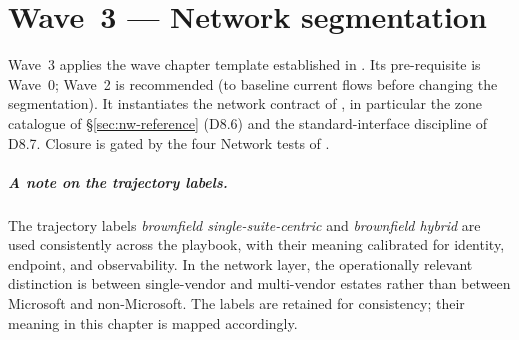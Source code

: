 
\chapter{Wave~3 --- Network segmentation}
\label{ch:wave3-network}

\begin{caveatbox}[Dependencies]
\noindent Wave~3 applies the wave chapter template established in
. Its pre-requisite is Wave~0;
Wave~2 is recommended (to baseline current flows before changing
the segmentation). It instantiates the network contract of
, in particular the zone catalogue of
\S\ref{sec:nw-reference} (D8.6) and the standard-interface
discipline of D8.7. Closure is gated by the four Network tests of
.
\end{caveatbox}

\paragraph{A note on the trajectory labels.} The trajectory labels
\emph{brownfield single-suite-centric} and \emph{brownfield hybrid}
are used consistently across the playbook, with their meaning
calibrated for identity, endpoint, and observability. In the
network layer, the operationally relevant distinction is between
single-vendor and multi-vendor estates rather than between
Microsoft and non-Microsoft. The labels are retained for
consistency; their meaning in this chapter is mapped accordingly.

